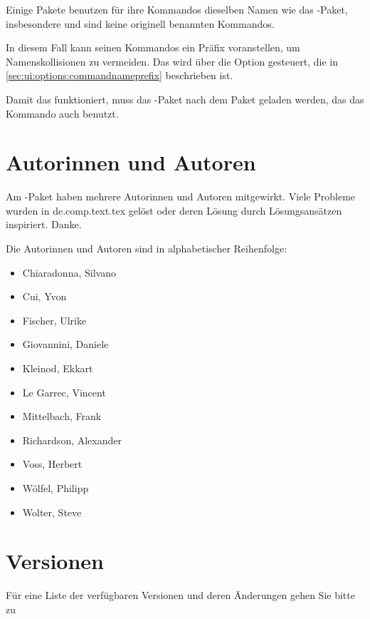 Einige Pakete benutzen für ihre Kommandos dieselben Namen wie das -Paket, insbesondere  und  sind keine originell benannten Kommandos.

In diesem Fall kann  seinen Kommandos ein Präfix voranstellen, um Namenskollisionen zu vermeiden.
Das wird über die Option  gesteuert, die in \autoref{sec:ui:options:commandnameprefix} beschrieben ist.

Damit das funktioniert, muss das -Paket nach dem Paket geladen werden, das das Kommando auch benutzt.



\cleardoublepage
\section{Autorinnen und Autoren}
\label{sec:authors}

Am -Paket haben mehrere Autorinnen und Autoren mitgewirkt.
Viele Probleme wurden in de.comp.text.tex gelöst oder deren Lösung durch Lösungsansätzen inspiriert.
Danke.

Die Autorinnen und Autoren sind in alphabetischer Reihenfolge:
\begin{itemize}
	\item Chiaradonna, Silvano
	\item Cui, Yvon
	\item Fischer, Ulrike
	\item Giovannini, Daniele
	\item Kleinod, Ekkart
	\item Le Garrec, Vincent
	\item Mittelbach, Frank
	\item Richardson, Alexander
	\item Voss, Herbert
	\item Wölfel, Philipp
	\item Wolter, Steve
\end{itemize}



\cleardoublepage
\section{Versionen}
\label{sec:versions}

Für eine Liste der verfügbaren Versionen und deren Änderungen gehen Sie bitte zu

